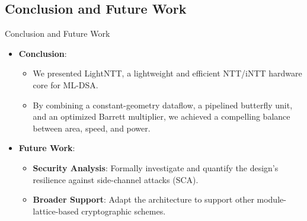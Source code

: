 \documentclass[
	10pt, t,
	hyperref={
		colorlinks,
		citecolor=CtpLatteTeal,
		linkcolor=CtpLatteTeal,
		urlcolor=CtpLatteBlue,
		pdfauthor={Bardia Taghavi},
		pdftitle={LightNTT: A Tiny NTT/iNTT Core for ML-DSA Featuring a Constant-Geometry Pipelined Design},
		pdfsubject={Cryptography},
		pdfkeywords={NTT, iNTT, ML-DSA, Constant-Geometry Pipelined Design},
		pdfcreator={Bardia Taghavi},
		pdfproducer={Bardia Taghavi}
		},
	aspectratio=1610,
	]
	{beamer}
\begin{document}
\subsection{Conclusion and Future Work}
\begin{frame}{Conclusion and Future Work}
	\begin{itemize}\setlength{\itemsep}{1em}
		\item \textbf{Conclusion}:
		\begin{itemize}\setlength{\itemsep}{1ex}\vspace{1ex}
			\item We presented LightNTT, a lightweight and efficient NTT/iNTT hardware core for ML-DSA.
			\item By combining a constant-geometry dataflow, a pipelined butterfly unit, and an optimized Barrett multiplier, we achieved a compelling balance between area, speed, and power.
		\end{itemize}
		\item \textbf{Future Work}:
		\begin{itemize}\setlength{\itemsep}{1ex}\vspace{1ex}
			\item \textbf{Security Analysis}: Formally investigate and quantify the design's resilience against side-channel attacks (SCA).
			\item \textbf{Broader Support}: Adapt the architecture to support other module-lattice-based cryptographic schemes.
		\end{itemize}
	\end{itemize}
\end{frame}
\end{document}
